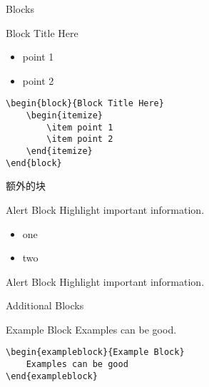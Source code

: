 \documentclass[newPxFont,sthlmFooter]{beamer}
\begin{document}

\begin{frame}[containsverbatim]{Blocks}

\begin{block}{Block Title Here}
	\begin{itemize}
		\item point 1
		\item point 2
	\end{itemize}
\end{block}
\begin{verbatim}
\begin{block}{Block Title Here}
    \begin{itemize}
        \item point 1
        \item point 2
    \end{itemize}
\end{block}
\end{verbatim}
\end{frame}


\begin{frame}[containsverbatim]{额外的块}
\begin{alertblock}{Alert Block}
	Highlight important information.
\end{alertblock}
\begin{itemize}
    \item one
    \item two
\end{itemize}

\begin{sthlmLatex}
\begin{alertblock}{Alert Block}
Highlight important information.
\end{alertblock}
\end{sthlmLatex}


\end{frame}


\begin{frame}[containsverbatim]{Additional Blocks}

\begin{exampleblock}{Example Block}
	Examples can be good.
\end{exampleblock}
\begin{verbatim}
\begin{exampleblock}{Example Block}
    Examples can be good
\end{exampleblock}
\end{verbatim}
\end{frame}
\end{document}
